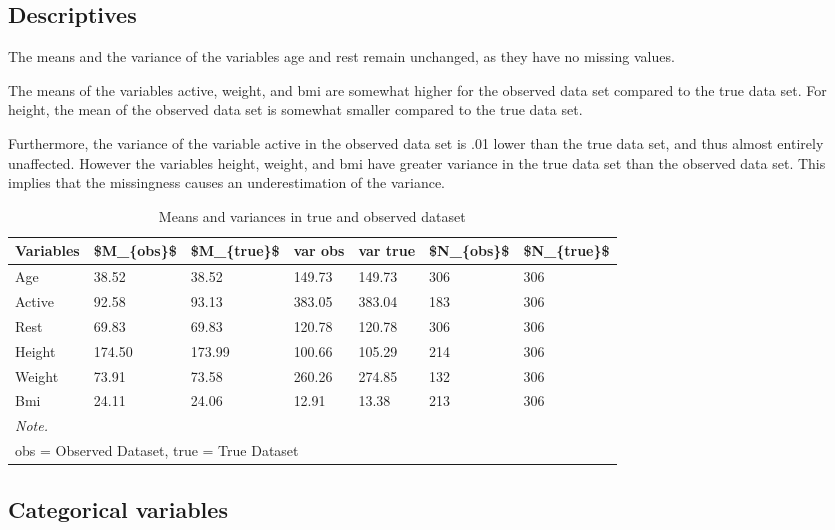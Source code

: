 \documentclass[
]{article}
\begin{document}
\hypertarget{data1}{%
\subsection{Descriptives}\label{data1}}

The means and the variance of the variables age and rest remain unchanged, as they have no missing values. 

The means of the variables active, weight, and bmi are somewhat higher for the observed data set compared to the true data set. For height, the mean of the observed data set is somewhat smaller compared to the true data set.

Furthermore, the variance of the variable active in the observed data set is .01 lower than the true data set, and thus almost entirely unaffected. However the variables height, weight, and bmi have greater variance in the true data set than the observed data set. This implies that the missingness causes an underestimation of the variance.

\begin{table}

\caption{\label{tab:des}Means and variances in true and observed dataset}
\centering
\begin{tabular}[t]{l|l|l|l|l|l|l}
\hline
Variables & \$M\_\{obs\}\$ & \$M\_\{true\}\$ & var obs & var true & \$N\_\{obs\}\$ & \$N\_\{true\}\$\\
\hline
Age & 38.52 & 38.52 & 149.73 & 149.73 & 306 & 306\\
\hline
Active & 92.58 & 93.13 & 383.05 & 383.04 & 183 & 306\\
\hline
Rest & 69.83 & 69.83 & 120.78 & 120.78 & 306 & 306\\
\hline
Height & 174.50 & 173.99 & 100.66 & 105.29 & 214 & 306\\
\hline
Weight & 73.91 & 73.58 & 260.26 & 274.85 & 132 & 306\\
\hline
Bmi & 24.11 & 24.06 & 12.91 & 13.38 & 213 & 306\\
\hline
\multicolumn{7}{l}{\rule{0pt}{1em}\textit{Note.}}\\
\multicolumn{7}{l}{\rule{0pt}{1em}obs = Observed Dataset, true = True Dataset}\\
\end{tabular}
\end{table}

\hypertarget{data2}{%
\subsection{Categorical variables}\label{data2}}
\end{document}
